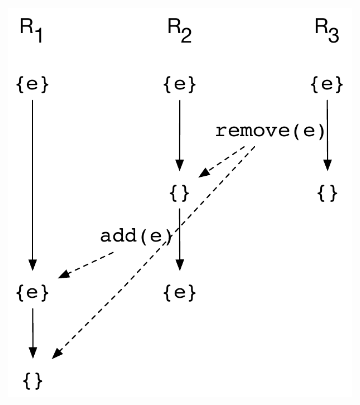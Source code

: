 \begin{figure}[ht]
  \centering
  \begin{subfigure}[t]{0.55\columnwidth}
    \includegraphics[scale=0.35]{Figures/crdt-execs-1}
    \caption{}
    \label{fig:crdt-exec-1}
  \end{subfigure}
  \begin{subfigure}[t]{0.44\columnwidth}

\end{subfigure}
\end{figure}
